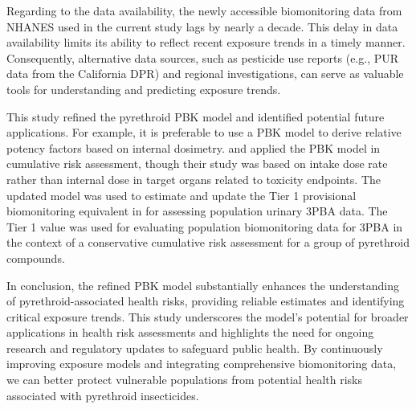 \documentclass[toxics,article,submit,pdftex,moreauthors]{Definitions/mdpi}
\begin{document}
Regarding to the data availability, the newly accessible biomonitoring
data from NHANES used in the current study lags by nearly a decade. This
delay in data availability limits its ability to reflect recent exposure
trends in a timely manner. Consequently, alternative data sources, such
as pesticide use reports (e.g., PUR data from the California DPR) and
regional investigations, can serve as valuable tools for understanding
and predicting exposure trends.

This study refined the pyrethroid PBK model and identified potential
future applications. For example, it is preferable to use a PBK model to
derive relative potency factors based on internal dosimetry.
\citet{quindroit2021estimating} and \citet{thepaut_pbpk_2024} applied
the PBK model in cumulative risk assessment, though their study was
based on intake dose rate rather than internal dose in target organs
related to toxicity endpoints. The updated model was used to estimate
and update the Tier 1 provisional biomonitoring equivalent in
\citet{aylward_screening_level_2018} for assessing population urinary
3PBA data. The Tier 1 value was used for evaluating population
biomonitoring data for 3PBA in the context of a conservative cumulative
risk assessment for a group of pyrethroid compounds.

In conclusion, the refined PBK model substantially enhances the
understanding of pyrethroid-associated health risks, providing reliable
estimates and identifying critical exposure trends. This study
underscores the model's potential for broader applications in health
risk assessments and highlights the need for ongoing research and
regulatory updates to safeguard public health. By continuously improving
exposure models and integrating comprehensive biomonitoring data, we can
better protect vulnerable populations from potential health risks
associated with pyrethroid insecticides.


\vspace{6pt} 


\end{document}
